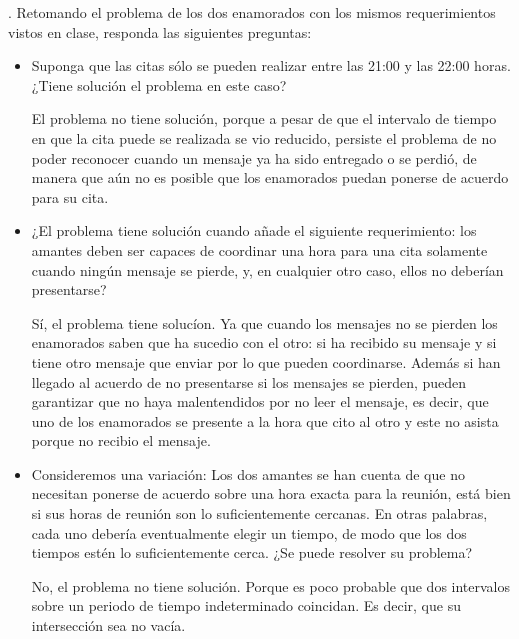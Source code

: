 . Retomando el problema de los dos enamorados con
los mismos requerimientos vistos en clase, responda
las siguientes preguntas:

\begin{itemize}
\item Suponga que las citas sólo se pueden realizar
  entre las 21:00 y las 22:00 horas. ¿Tiene solución
  el problema en este caso?
  
  El problema no tiene solución, porque a pesar de que el intervalo de tiempo en que la cita puede se realizada se vio reducido, persiste el problema de no poder reconocer cuando un mensaje ya ha sido entregado o se perdió, de manera que aún no es posible que los enamorados puedan ponerse de acuerdo para su cita.

\item ¿El problema tiene solución cuando añade el siguiente
  requerimiento: los amantes deben ser capaces de coordinar
  una hora para una cita solamente cuando ningún mensaje
  se pierde, y, en cualquier otro caso, ellos no deberían
  presentarse?
  
  Sí, el problema tiene solucíon. Ya que cuando los mensajes no se pierden los enamorados saben que ha sucedio con el otro: si ha recibido su mensaje y si tiene otro mensaje que enviar por lo que pueden coordinarse. Además si han llegado al acuerdo de no presentarse si los mensajes se pierden, pueden garantizar que no haya malentendidos por no leer el mensaje, es decir, que uno de los enamorados se presente a la hora que cito al otro y este no asista porque no recibio el mensaje.

\item Consideremos una variación: Los dos amantes se han
  cuenta de que no necesitan ponerse de acuerdo sobre una
  hora exacta para la reunión, está bien si sus horas de
  reunión son lo suficientemente cercanas. En otras palabras,
  cada uno debería eventualmente elegir un tiempo, de modo
  que los dos tiempos estén lo suficientemente cerca. ¿Se
  puede resolver su problema?
  
  No, el problema no tiene solución. Porque es poco probable que dos intervalos sobre un periodo de tiempo indeterminado coincidan. Es decir, que su intersección sea no vacía.

  
\end{itemize}
